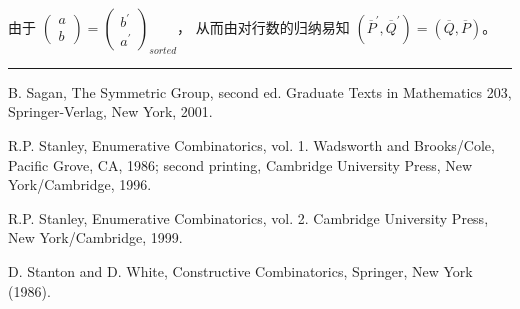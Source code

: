 \documentclass[a4paper,11pt]{article}
\def\qed{\nopagebreak\hfill{\rule{4pt}{7pt}}\medbreak}
\begin{document}
 由于 $\left(\begin{array}{c}
a\\b\end{array}\right)=\left(\begin{array}{c}
b^{'}\\a^{'}\end{array}\right)_{sorted}$， 从而由对行数的归纳易知
$({\overline{P}}^{'}, \overline{Q}^{'})=(\overline{Q},
\overline{P})$。 \qed





% 
\begin{thebibliography}{99}



B. Sagan, The Symmetric Group, second ed. Graduate Texts in
Mathematics 203, Springer-Verlag, New York, 2001.


R.P. Stanley, Enumerative Combinatorics, vol. 1. Wadsworth and
Brooks/Cole, Pacific Grove, CA, 1986; second printing, Cambridge
University Press, New York/Cambridge, 1996.

R.P. Stanley, Enumerative Combinatorics, vol. 2. Cambridge
University Press, New York/Cambridge, 1999.

D. Stanton and D. White, Constructive Combinatorics, Springer, New York (1986).


\end{thebibliography}
\end{document}
